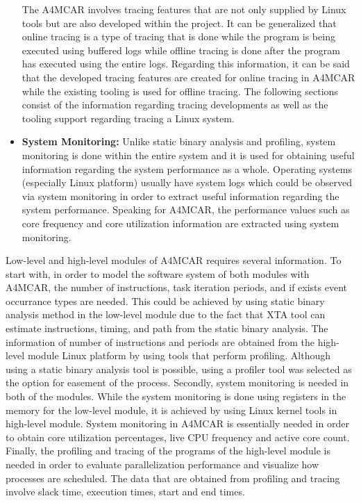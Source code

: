 \begin{itemize}
	The A4MCAR involves tracing features that are not only supplied by Linux tools but are also developed within the project. It can be generalized that online tracing is a type of tracing that is done while the program is being executed using buffered logs while offline tracing is done after the program has executed using the entire logs. Regarding this information, it can be said that the developed tracing features are created for online tracing in A4MCAR while the existing tooling is used for offline tracing. The following sections consist of the information regarding tracing developments as well as the tooling support regarding tracing a Linux system.
	\item \textbf{System Monitoring:} Unlike static binary analysis and profiling, system monitoring \cite{systemmonitoring} is done within the entire system and it is used for obtaining useful information regarding the system performance as a whole. Operating systems (especially Linux platform) usually have system logs which could be observed via system monitoring in order to extract useful information regarding the system performance. Speaking for A4MCAR, the performance values such as core frequency and core utilization information are extracted using system monitoring.
\end{itemize}

Low-level and high-level modules of A4MCAR requires several information. To start with, in order to model the software system of both modules with A4MCAR, the number of instructions, task iteration periods, and if exists event occurrance types are needed. This could be achieved by using static binary analysis method in the low-level module due to the fact that XTA tool can estimate instructions, timing, and path from the static binary analysis. The information of number of instructions and periods are obtained from the high-level module Linux platform by using tools that perform profiling. Although using a static binary analysis tool is possible, using a profiler tool was selected as the option for easement of the process. Secondly, system monitoring is needed in both of the modules. While the system monitoring is done using registers in the memory for the low-level module, it is achieved by using Linux kernel tools in high-level module. System monitoring in A4MCAR is essentially needed in order to obtain core utilization percentages, live CPU frequency and active core count. Finally, the profiling and tracing of the programs of the high-level module is needed in order to evaluate parallelization performance and visualize how processes are scheduled. The data that are obtained from profiling and tracing involve slack time, execution times, start and end times.


